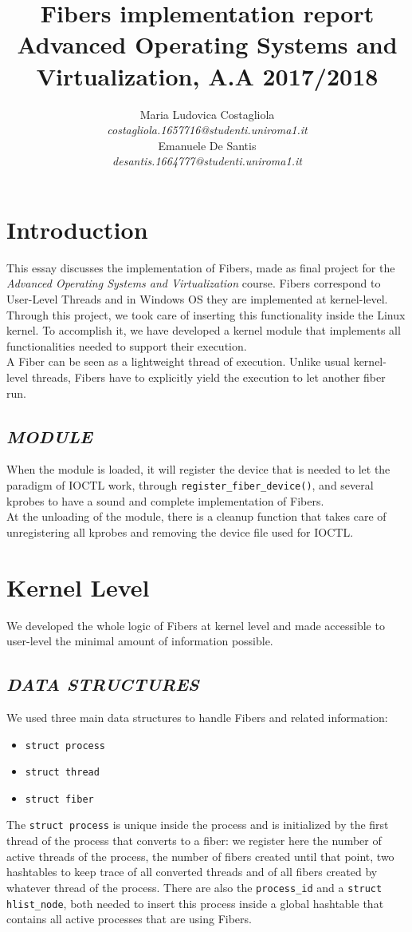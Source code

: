 \documentclass[a4paper]{article}
\author{\large Maria Ludovica Costagliola \\
        \small \textit{costagliola.1657716@studenti.uniroma1.it} \medskip\\
        \large Emanuele De Santis \\
        \small \textit{desantis.1664777@studenti.uniroma1.it}}
\title{Fibers implementation report\\
        \smallskip
        \small Advanced Operating Systems and Virtualization, A.A 2017/2018}
\date{}
\begin{document}
\maketitle
\section{Introduction}
This essay discusses the implementation of Fibers, made as final project for the \textit{Advanced Operating Systems and Virtualization} course. Fibers correspond to User-Level Threads and in Windows OS they are implemented at kernel-level. Through this project, we took care of inserting this functionality inside the Linux kernel. To accomplish it, we have developed a kernel module that implements all functionalities needed to support their execution.\bigskip\\
A Fiber can be seen as a lightweight thread of execution. Unlike usual kernel-level threads, Fibers have to explicitly yield the execution to let another fiber run.

\subsection*{\textit{MODULE}}
When the module is loaded, it will register the device that is needed to let the paradigm of IOCTL work, through \texttt{register\_fiber\_device()}, and several kprobes to have a sound and complete implementation of Fibers.\bigskip\\
At the unloading of the module, there is a cleanup function that takes care of unregistering all kprobes and removing the device file used for IOCTL.

\section{Kernel Level}
We developed the whole logic of Fibers at kernel level and made accessible to user-level the minimal amount of information possible.

\subsection*{\textit{DATA STRUCTURES}}
We used three main data structures to handle Fibers and related information:
\begin{itemize}
  \item \texttt{struct process}
  \item \texttt{struct thread}
  \item \texttt{struct fiber}
\end{itemize}
The \texttt{struct process} is unique inside the process and is initialized by the first thread of the process that converts to a fiber: we register here the number of active threads of the process, the number of fibers created until that point, two hashtables to keep trace of all converted threads and of all fibers created by whatever thread of the process. There are also the \texttt{process\_id} and a \texttt{struct hlist\_node}, both needed to insert this process inside a global hashtable that contains all active processes that are using Fibers.\bigskip\\
\end{document}
